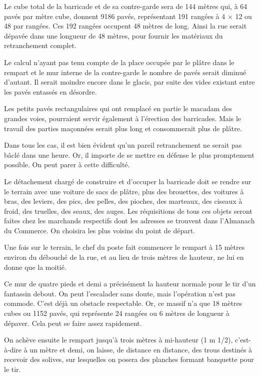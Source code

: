 \documentclass[french,twoside]{book} %
\begin{document}
\noindent Le cube total de la barricade et de sa contre-garde sera de 144 mètres qui, à 64 pavés par mètre cube, donnent 9186 pavés, représentant 191 rangées à 4 × 12 ou 48 par rangées. Ces 192 rangées occupent 48 mètres de long. Ainsi la rue serait dépavée dans une longueur de 48 mètres, pour fournir les matériaux du retranchement complet.\par
Le calcul n’ayant pas tenu compte de la place occupée par le plâtre dans le rempart et le mur interne de la contre-garde le nombre de pavés serait diminué d’autant. Il serait moindre encore dans le glacis, par suite des vides existant entre les pavés entassés en désordre.\par
Les petits pavés rectangulaires qui ont remplacé en partie le macadam des grandes voies, pourraient servir également à l’érection des barricades. Mais le travail des parties maçonnées serait plus long et consommerait plus de plâtre.\par
Dans tous les cas, il est bien évident qu’un pareil retranchement ne serait pas bâclé dans une heure. Or, il importe de se mettre en défense le plus promptement possible. On peut parer à cette difficulté.\par
Le détachement chargé de construire et d’occuper la barricade doit se rendre sur le terrain avec une voiture de sacs de plâtre, plus des brouettes, des voitures à bras, des leviers, des pics, des pelles, des pioches, des marteaux, des ciseaux à froid, des truelles, des seaux, des auges. Les réquisitions de tous ces objets seront faites chez les marchands respectifs dont les adresses se trouvent dans l’Almanach du Commerce. On choisira les plus voisins du point de départ.\par
Une fois sur le terrain, le chef du poste fait commencer le rempart à 15 mètres environ du débouché de la rue, et au lieu de trois mètres de hauteur, ne lui en donne que la moitié.\par
Ce mur de quatre pieds et demi a précisément la hauteur normale pour le tir d’un fantassin debout. On peut l’escalader sans doute, mais l’opération n’est pas commode. C'est déjà un obstacle respectable. Or, ce massif n’a que 18 mètres cubes ou 1152 pavés, qui représente 24 rangées ou 6 mètres de longueur à dépaver. Cela peut se faire assez rapidement.\par
On achève ensuite le rempart jusqu’à trois mètres à mi-hauteur (1 m 1/2), c’est-à-dire à un mètre et demi, on laisse, de distance en distance, des trous destinés à recevoir des solives, sur lesquelles on posera des planches formant banquette pour le tir.\par
\end{document}
